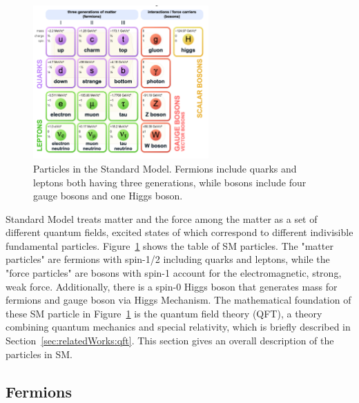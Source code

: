 \begin{figure}[ht]
    \centering
    \includegraphics[width=0.6\textwidth]{chapters/RelatedWorks/sectionSMParticles/figures/sm.png}
    \caption{Particles in the Standard Model. Fermions include quarks and leptons both having three generations, while bosons include four gauge bosons and one Higgs boson.}
    \label{fig:relatedWorks:smParticles:sm}
\end{figure}

Standard Model treats matter and the force among the matter as a set of different quantum fields, excited states of which correspond to different indivisible fundamental particles. Figure~\ref{fig:relatedWorks:smParticles:sm} shows the table of SM particles. The "matter particles" are fermions with spin-1/2 including quarks and leptons, while the "force particles" are bosons with spin-1 account for the electromagnetic, strong, weak force. Additionally, there is a spin-0 Higgs boson that generates mass for fermions and gauge boson via Higgs Mechanism. The mathematical foundation of these SM particle in Figure~\ref{fig:relatedWorks:smParticles:sm} is the quantum field theory (QFT), a theory combining quantum mechanics and special relativity, which is briefly described in Section~\ref{sec:relatedWorks:qft}. This section gives an overall description of the particles in SM. 


\subsection{Fermions}
\label{sec:relatedWorks:smParticles:fermion}

